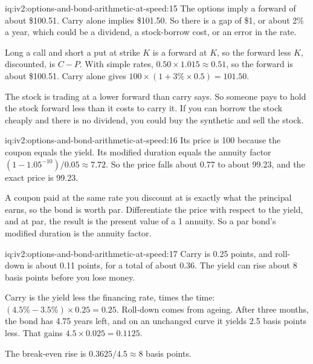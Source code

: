 \begin{solution}{iq:iv2:options-and-bond-arithmetic-at-speed:15}
The options imply a forward of about \$100.51. Carry alone implies \$101.50. So there is a gap of \$1, or about 2\% a year, which could be a dividend, a stock-borrow cost, or an error in the rate.

Long a call and short a put at strike $K$ is a forward at $K$, so the forward less $K$, discounted, is $C - P$. With simple rates, $0.50 \times 1.015 \approx 0.51$, so the forward is about \$100.51. Carry alone gives $100 \times (1 + 3\% \times 0.5) = 101.50$.

The stock is trading at a lower forward than carry says. So someone pays to hold the stock forward less than it costs to carry it. If you can borrow the stock cheaply and there is no dividend, you could buy the synthetic and sell the stock.

\end{solution}

\begin{solution}{iq:iv2:options-and-bond-arithmetic-at-speed:16}
Its price is 100 because the coupon equals the yield. Its modified duration equals the annuity factor $(1 - 1.05^{-10})/0.05 \approx 7.72$. So the price falls about 0.77 to about 99.23, and the exact price is 99.23.

A coupon paid at the same rate you discount at is exactly what the principal earns, so the bond is worth par. Differentiate the price with respect to the yield, and at par, the result is the present value of a 1 annuity. So a par bond's modified duration is the annuity factor.

\end{solution}

\begin{solution}{iq:iv2:options-and-bond-arithmetic-at-speed:17}
Carry is 0.25 points, and roll-down is about 0.11 points, for a total of about 0.36. The yield can rise about 8 basis points before you lose money.

Carry is the yield less the financing rate, times the time: $(4.5\% - 3.5\%) \times 0.25 = 0.25$. Roll-down comes from ageing. After three months, the bond has 4.75 years left, and on an unchanged curve it yields 2.5 basis points less. That gains $4.5 \times 0.025 = 0.1125$.

The break-even rise is $0.3625/4.5 \approx 8$ basis points.

\end{solution}

